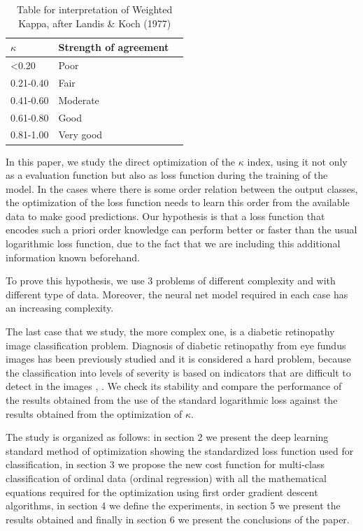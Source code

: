 \documentclass[times,twocolumn,final,authoryear]{elsarticle}
\begin{document}
\begin{table}
	\caption{\label{tab:kappa_int}Table for interpretation of Weighted Kappa, after Landis \& Koch (1977)}	
	\centering
	\begin{tabular}{llr}
		\hline
		$\kappa$    & Strength of agreement \\
		\hline
		<0.20 		& Poor \\
		0.21-0.40 	& Fair \\
		0.41-0.60 	& Moderate \\
		0.61-0.80 	& Good \\
		0.81-1.00 	& Very good \\
		\hline
	\end{tabular}
\end{table}

In this paper, we study the direct optimization of the $\kappa$ index, using it not only as a evaluation function but also as loss function during the training of the model. In the cases where there is some order relation between the output classes, the optimization of the loss function needs to learn this order from the available data to make good predictions. Our hypothesis is that a loss function that encodes such a priori order knowledge can perform better or faster than the usual logarithmic loss function, due to the fact that we are including this additional information known beforehand. 

To prove this hypothesis, we use 3 problems of different complexity and with  different type of data. Moreover, the neural net model required in each case has an increasing complexity.

The last case that we study, the more complex one, is a diabetic retinopathy image classification problem. Diagnosis of diabetic retinopathy from eye fundus images has been previously studied and it is considered a hard problem, because the classification into levels of severity is based on indicators that are difficult to detect in the images \citep{DBLP:conf/ccia/TorreVP16}, \citep{DBLP:conf/ccia/Escorcia-Gutierrez16}. 
We check its stability and compare the performance of the results obtained from the use of the standard logarithmic loss against the results obtained from the optimization of $\kappa$. 

The study is organized as follows: in section 2 we present the deep learning standard method of optimization showing the standardized loss function used for classification, in section 3 we propose the new cost function for multi-class classification of ordinal data (ordinal regression) with all the mathematical equations required for the optimization using first order gradient descent algorithms, in section 4 we define the experiments, in section 5 we present the results obtained and finally in section 6 we present the conclusions of the paper.
\end{document}
